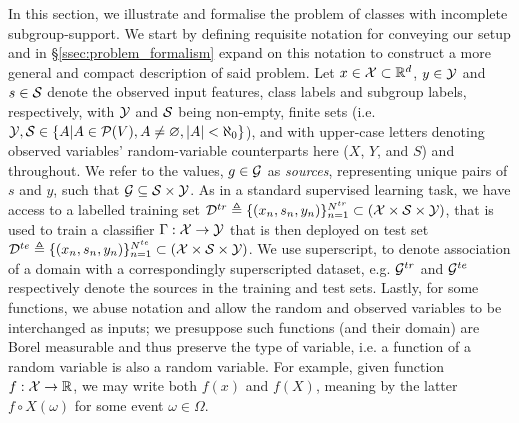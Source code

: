 In this section, we illustrate and formalise the problem of classes with incomplete
subgroup-support. 
%
We start by defining requisite notation for conveying our setup and in
\S\ref{ssec:problem_formalism} expand on this notation to construct a more general and compact
description of said problem. 
%
Let \( x \in {\mathcal{X}} \subset \mathbb{R}^d \), \( y \in {\mathcal{Y}} \) and \( s \in {\mathcal{S}} \) denote the observed input
features, class labels and subgroup labels, respectively, with \( {\mathcal{Y}} \) and \( {\mathcal{S}} \) being
non-empty, finite sets (i.e. \( {\mathcal{Y}}, {\mathcal{S}} \in \{ A | A \in {\mathcal{P}}(V), A \neq \varnothing, |A| <
\aleph_0 \} \)), and with upper-case letters denoting observed variables' random-variable
counterparts here (\(X\), \(Y\), and \(S\)) and throughout.
%
We refer to the values, \( g \in {\mathcal{G}} \) as \emph{sources}, representing unique pairs of \( s \) and
\( y \), such that \(  {\mathcal{G}} \subseteq {\mathcal{S}} \times {\mathcal{Y}} \). 
%
As in a standard supervised learning task, we have access to a labelled training set \( {\mathcal{D}}^{tr}
\triangleq \{ (x_n, s_n, y_n) \}_{n=1}^{N^{tr}} \subset ({\mathcal{X}} \times {\mathcal{S}} \times {\mathcal{Y}}) \), that is used to
train a classifier \( \Gamma:{\mathcal{X}} \rightarrow {\mathcal{Y}} \) that is then deployed on test set \( {\mathcal{D}}^{te}
\triangleq \{ (x_n, s_n, y_n) \}_{n=1}^{N^{te}} \subset ({\mathcal{X}} \times {\mathcal{S}} \times {\mathcal{Y}}) \). 
%
We use superscript, to denote association of a domain with a correspondingly superscripted dataset,
e.g. \( {\mathcal{G}}^{tr} \) and \( {\mathcal{G}}^{te} \) respectively denote the sources in the training and test
sets.
%
Lastly, for some functions, we abuse notation and allow the random and observed variables to be
interchanged as inputs; we presuppose such functions (and their domain) are Borel measurable and
thus preserve the type of variable, i.e. a function of a random variable is also a random variable.
%
For example, given function \(f: {\mathcal{X}} \to \mathbb{R} \), we may write both \( f(x) \) and \( f(X) \),
meaning by the latter \( f \circ X(\omega) \) for some event \( \omega \in \Omega \).
%
